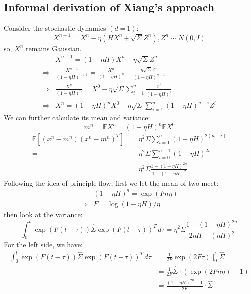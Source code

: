 \subsection{Informal derivation of Xiang's approach}
Consider the stochastic dynamics $(d=1)$:
$$
X^{n+1}=X^n-\eta\left( HX^n+\sqrt{\Sigma}Z^{n} \right) ,Z^{n}\sim N(0,I)
$$
so, $X^n$ remains Gaussian.
\begin{equation*}
    \begin{aligned}
        &X^{n+1}=\left(1-\eta H\right) X^n-\eta \sqrt{\Sigma}Z^{n} \\
        \Rightarrow& \frac{X^{n+1}}{\left(1-\eta H\right)^{n+1}} = \frac{X^{n}}{\left(1-\eta H\right)^{n}}-\frac{\eta \sqrt{\Sigma}Z^{n}}{\left(1-\eta H\right)^{n+1}}\\
        \Rightarrow& \frac{X^{n}}{\left(1-\eta H\right)^{n}} =X^0 - \eta\sqrt{\Sigma}\sum_{i = 1}^{n}\frac{Z^i}{\left(1-\eta H\right)^{i}} \\
        \Rightarrow& X^{n} =\left(1-\eta H\right)^{n}X^0 -\eta\sqrt{\Sigma}\sum_{i = 1}^{n}\left(1-\eta H\right)^{n-i}Z^i
    \end{aligned}
\end{equation*}
We can further calculate its mean and variance:
$$
m^n = \mathbb{E} X^n = (1-\eta H)^n \mathbb{E} X^0
$$
\begin{equation*}
    \begin{aligned}
        \mathbb{E}\left[ (x^n-m^n)(x^n-m^n)^T \right] =& \eta^2\Sigma  \sum_{i = 1}^{n}(1-\eta H)^{2(n-i)}\\
        =&\eta^2\Sigma \sum_{i = 0}^{n-1}(1-\eta H)^{2i}\\
        =&\eta^2\Sigma\frac{1-(1-\eta H)^{2n}}{1-(1-\eta H)^2}
    \end{aligned}
\end{equation*}
Following the idea of principle flow, first we let the mean of two meet:
\begin{equation*}
    \begin{aligned}
        &(1-\eta H)^n = \exp(Fn\eta)\\
        \Rightarrow& F = \log(1-\eta H)/\eta
    \end{aligned}
\end{equation*}
then look at the variance:
$$
\int_{0}^{t} \exp(F(t-\tau))\widehat{\Sigma}\exp(F(t-\tau))^T \,d\tau = \eta^2\Sigma\frac{1-(1-\eta H)^{2n}}{2\eta H-(\eta H)^2}
$$
For the left side, we have:
\begin{equation*}
    \begin{aligned}
        \int_{0}^{t} \exp(F(t-\tau))\widehat{\Sigma}\exp(F(t-\tau))^T \,d\tau &= \frac{1}{2F}\exp(2F\tau)\mid _0^{t}\widehat{\Sigma}\\
        &=\frac{1}{2F}\widehat{\Sigma}\cdot(\exp(2Fn\eta)-1)\\
        &=\frac{(1-\eta H)^{2n}-1}{2F}\cdot\widehat{\Sigma}
    \end{aligned}
\end{equation*}
